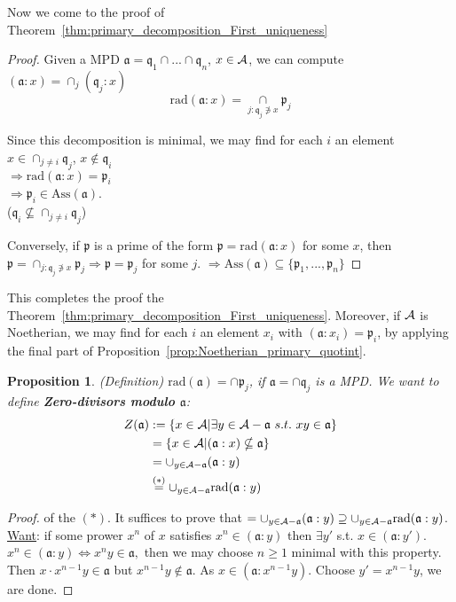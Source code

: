 \documentclass[11pt]{article}
\newtheorem{prop}[thm]{Proposition}
\newcommand{\sca}{{\mathfrak a}}
\newcommand{\scp}{{\mathfrak p}}
\newcommand{\scq}{\mathfrak q}
\newcommand{\cala}{{\cal A}}
\newcommand{\Lrta}{\Longrightarrow}
\newcommand{\Llrta}{\Longleftrightarrow}
\begin{document}
Now we come to the proof of Theorem~\ref{thm:primary_decomposition_First_uniqueness}
\begin{proof}
Given a MPD $\sca=\scq_1\cap...\cap\scq_n$, $x\in\cala$, we can compute $(\sca:x)=\cap_{j}(\scq_j:x)$
$$
\text{rad}(\sca:x)=\underset{j:\scq_j\not\ni x}{\cap}\scp_j
$$

Since this decomposition is minimal, we may find for each $i$ an element $x\in\cap_{j\neq i}\scq_j$, $x\notin\scq_i$\\
$\Lrta \text{rad}(\sca:x)=\scp_i$\\
$\Lrta \scp_i\in \text{Ass}(  \sca)$.\\ ($\scq_i\not \subseteq \cap_{j\neq i}\scq_j$) 

Conversely, if $\scp$ is a prime of the form $\scp=\text{rad}(\sca:x)$ for some $x$, then $\scp=\cap_{j:\scq_j\not\ni x}\scp_j\Lrta \scp=\scp_j$ for some $j$. $\Lrta \text{Ass}(  \sca)\subseteq \{\scp_1,...,\scp_n\}$
\end{proof}

This completes the proof the Theorem~\ref{thm:primary_decomposition_First_uniqueness}. Moreover, if $\cala$ is Noetherian, we may find for each $i$ an element $x_i$ with $(\sca:x_i)=\scp_i$, by applying the final part of Proposition~\ref{prop:Noetherian_primary_quotint}.


\begin{prop}\label{prop:zero-divisors_modulo_a}
(Definition) $\text{rad}(\sca)=\cap\scp_j$, if $\sca=\cap\scq_j$ is a  MPD. We want to define 
\textbf{Zero-divisors modulo $\sca$}: 
$$
\begin{aligned}
Z(\sca)&:=\{x\in\cala|\exists y\in\cala-\sca\ s.t.\ xy\in\sca\}\\
&=\{x\in\cala|(\sca:x)\nsubseteq\sca\}\\
&=\cup_{y\in\cala-\sca}(\sca:y)\\
&\overset{(*)}{=}\cup_{y\in\cala-\sca}\text{rad}(\sca:y)
\end{aligned}
$$
\end{prop}
\begin{proof} of the $(*)$. It suffices to prove that $=\cup_{y\in\cala-\sca}(\sca:y)\supseteq\cup_{y\in\cala-\sca}\text{rad}(\sca:y)$. \underline{Want}:  if some prower $x^n$ of $x$ satisfies $x^n\in(\sca:y)$ then $\exists y'$ s.t. $x\in (\sca:y')$.  $x^n\in(\sca:y)\Llrta x^n y\in\sca,$ then we may choose $n\geq 1$ minimal with this property. Then $x\cdot x^{n-1}y\in \sca$ but $x^{n-1}y \notin \sca$. As $x\in(\sca:x^{n-1}y)$. Choose $y'=x^{n-1}y$, we are done.
\end{proof}
\end{document}

